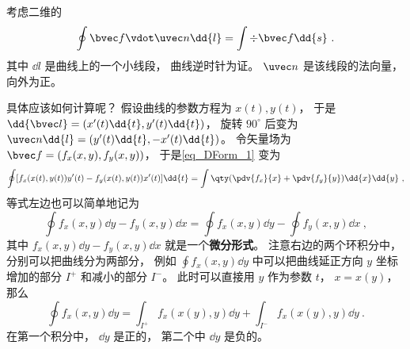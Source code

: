 
\begin{issues}
\issueDraft
{}
\end{issues}


考虑二维的
\begin{equation}\label{eq_DForm_1}
\oint \bvec f \vdot \uvec n \dd{l} = \int \div \bvec f \dd{s}~.
\end{equation}
其中 $\dd{l}$ 是曲线上的一个小线段， 曲线逆时针为证。 $\uvec n$ 是该线段的法向量， 向外为正。

具体应该如何计算呢？ 假设曲线的参数方程为 $x(t), y(t)$， 于是 $\dd{\bvec l} = (x'(t)\dd{t}, y'(t)\dd{t})$， 旋转 $90^\circ$ 后变为 $\uvec n \dd{l} = (y'(t)\dd{t}, -x'(t)\dd{t})$。 令矢量场为 $\bvec f = (f_x(x,y), f_y(x,y))$， 于是\autoref{eq_DForm_1} 变为
\begin{equation}
\oint [f_x(x(t),y(t)) y'(t) - f_y(x(t),y(t)) x'(t)]\dd{t}
= \int \qty(\pdv{f_x}{x} + \pdv{f_y}{y}) \dd{x}\dd{y}~,
\end{equation}
等式左边也可以简单地记为
\begin{equation}
\oint f_x(x,y) \dd{y} - f_y(x,y) \dd{x} = \oint f_x(x,y) \dd{y} - \oint f_y(x,y) \dd{x}~,
\end{equation}
其中 $f_x(x,y) \dd{y} - f_y(x,y) \dd{x}$ 就是一个\textbf{微分形式}。 注意右边的两个环积分中， 分别可以把曲线分为两部分， 例如 $\oint f_x(x,y) \dd{y}$ 中可以把曲线延正方向 $y$ 坐标增加的部分 $I^+$ 和减小的部分 $I^-$。 此时可以直接用 $y$ 作为参数 $t$， $x = x(y)$， 那么
\begin{equation}
\oint f_x(x,y) \dd{y} = \int_{I^+} f_x(x(y),y) \dd{y} + \int_{I^-} f_x(x(y),y) \dd{y}~.
\end{equation}
在第一个积分中， $\dd{y}$ 是正的， 第二个中 $\dd{y}$ 是负的。

